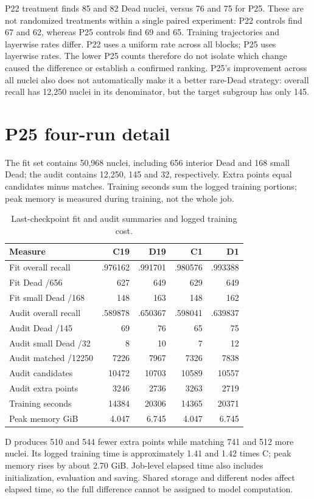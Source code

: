 P22 treatment finds 85 and 82 Dead nuclei, versus 76 and 75 for P25. These are not randomized treatments within a single paired experiment: P22 controls find 67 and 62, whereas P25 controls find 69 and 65. Training trajectories and layerwise rates differ. P22 uses a uniform rate across all blocks; P25 uses layerwise rates. The lower P25 counts therefore do not isolate which change caused the difference or establish a confirmed ranking. P25's improvement across all nuclei also does not automatically make it a better rare-Dead strategy: overall recall has 12,250 nuclei in its denominator, but the target subgroup has only 145.

\section{P25 four-run detail}
The fit set contains 50,968 nuclei, including 656 interior Dead and 168 small Dead; the audit contains 12,250, 145 and 32, respectively. Extra points equal candidates minus matches. Training seconds sum the logged training portions; peak memory is measured during training, not the whole job.
\begin{table}[H]\centering\small\begin{tabular}{lrrrr}\toprule
Measure & C19 & D19 & C1 & D1\\\midrule
Fit overall recall & .976162 & .991701 & .980576 & .993388\\
Fit Dead /656 & 627 & 649 & 629 & 649\\
Fit small Dead /168 & 148 & 163 & 148 & 162\\
Audit overall recall & .589878 & .650367 & .598041 & .639837\\
Audit Dead /145 & 69 & 76 & 65 & 75\\
Audit small Dead /32 & 8 & 10 & 7 & 12\\
Audit matched /12250 & 7226 & 7967 & 7326 & 7838\\
Audit candidates & 10472 & 10703 & 10589 & 10557\\
Audit extra points & 3246 & 2736 & 3263 & 2719\\
Training seconds & 14384 & 20306 & 14365 & 20371\\
Peak memory GiB & 4.047 & 6.745 & 4.047 & 6.745\\\bottomrule
\end{tabular}\caption{Last-checkpoint fit and audit summaries and logged training cost.}\end{table}
D produces 510 and 544 fewer extra points while matching 741 and 512 more nuclei. Its logged training time is approximately 1.41 and 1.42 times C; peak memory rises by about 2.70 GiB. Job-level elapsed time also includes initialization, evaluation and saving. Shared storage and different nodes affect elapsed time, so the full difference cannot be assigned to model computation.

